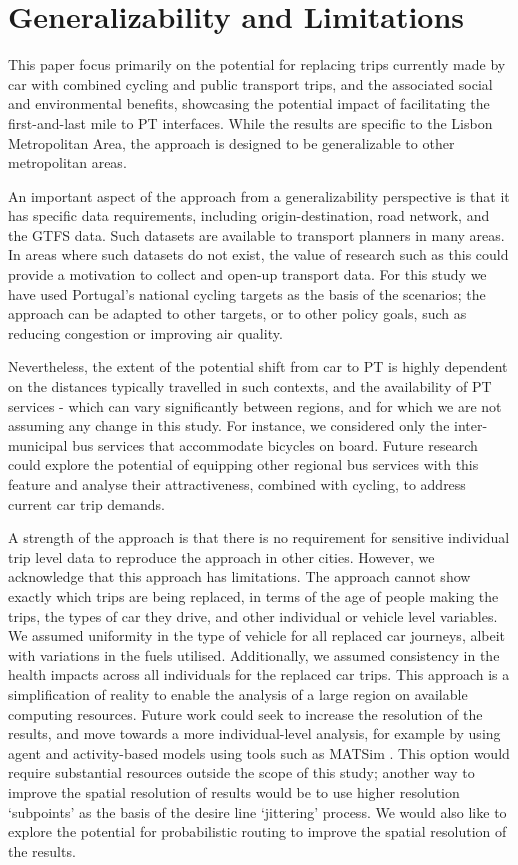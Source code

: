 \documentclass[review, doubleblind, 3p,
authoryear]{elsarticle} %
\begin{document}
\section{Generalizability and
Limitations}\label{generalizability-and-limitations}

This paper focus primarily on the potential for replacing trips
currently made by car with combined cycling and public transport trips,
and the associated social and environmental benefits, showcasing the
potential impact of facilitating the first-and-last mile to PT
interfaces. While the results are specific to the Lisbon Metropolitan
Area, the approach is designed to be generalizable to other metropolitan
areas.

An important aspect of the approach from a generalizability perspective
is that it has specific data requirements, including origin-destination,
road network, and the GTFS data. Such datasets are available to
transport planners in many areas. In areas where such datasets do not
exist, the value of research such as this could provide a motivation to
collect and open-up transport data. For this study we have used
Portugal's national cycling targets as the basis of the scenarios; the
approach can be adapted to other targets, or to other policy goals, such
as reducing congestion or improving air quality.

Nevertheless, the extent of the potential shift from car to PT is highly
dependent on the distances typically travelled in such contexts, and the
availability of PT services - which can vary significantly between
regions, and for which we are not assuming any change in this study. For
instance, we considered only the inter-municipal bus services that
accommodate bicycles on board. Future research could explore the
potential of equipping other regional bus services with this feature and
analyse their attractiveness, combined with cycling, to address current
car trip demands.

A strength of the approach is that there is no requirement for sensitive
individual trip level data to reproduce the approach in other cities.
However, we acknowledge that this approach has limitations. The approach
cannot show exactly which trips are being replaced, in terms of the age
of people making the trips, the types of car they drive, and other
individual or vehicle level variables. We assumed uniformity in the type
of vehicle for all replaced car journeys, albeit with variations in the
fuels utilised. Additionally, we assumed consistency in the health
impacts across all individuals for the replaced car trips. This approach
is a simplification of reality to enable the analysis of a large region
on available computing resources. Future work could seek to increase the
resolution of the results, and move towards a more individual-level
analysis, for example by using agent and activity-based models using
tools such as MATSim \citep{MATSim}. This option would require
substantial resources outside the scope of this study; another way to
improve the spatial resolution of results would be to use higher
resolution `subpoints' as the basis of the desire line `jittering'
process. We would also like to explore the potential for probabilistic
routing to improve the spatial resolution of the results.
\end{document}
